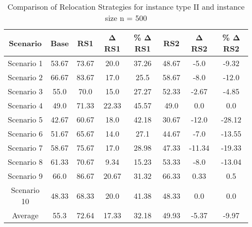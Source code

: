 \begin{table}[H]
\centering
\begin{tabular}{cccccccc}
  \hline
  \textbf{Scenario} & \textbf{Base} & \textbf{RS1} & \textbf{Δ RS1} & \textbf{\% Δ RS1} & \textbf{RS2} & \textbf{Δ RS2} & \textbf{\% Δ RS2} \\\hline
  Scenario 1 & 53.67 & 73.67 & 20.0 & 37.26 & 48.67 & -5.0 & -9.32 \\
  Scenario 2 & 66.67 & 83.67 & 17.0 & 25.5 & 58.67 & -8.0 & -12.0 \\
  Scenario 3 & 55.0 & 70.0 & 15.0 & 27.27 & 52.33 & -2.67 & -4.85 \\
  Scenario 4 & 49.0 & 71.33 & 22.33 & 45.57 & 49.0 & 0.0 & 0.0 \\
  Scenario 5 & 42.67 & 60.67 & 18.0 & 42.18 & 30.67 & -12.0 & -28.12 \\
  Scenario 6 & 51.67 & 65.67 & 14.0 & 27.1 & 44.67 & -7.0 & -13.55 \\
  Scenario 7 & 58.67 & 75.67 & 17.0 & 28.98 & 47.33 & -11.34 & -19.33 \\
  Scenario 8 & 61.33 & 70.67 & 9.34 & 15.23 & 53.33 & -8.0 & -13.04 \\
  Scenario 9 & 66.0 & 86.67 & 20.67 & 31.32 & 66.33 & 0.33 & 0.5 \\
  Scenario 10 & 48.33 & 68.33 & 20.0 & 41.38 & 48.33 & 0.0 & 0.0 \\
  Average & 55.3 & 72.64 & 17.33 & 32.18 & 49.93 & -5.37 & -9.97 \\\hline
\end{tabular}
\caption{Comparison of Relocation Strategies for instance type II and instance size n = 500}
\label{tab:wait:resrelocation-comparison_II_500}
\end{table}
